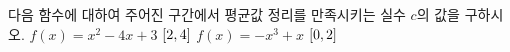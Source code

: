 다음 함수에 대하여 주어진 구간에서 평균값 정리를 만족시키는 실수 $c$의 값을 구하시오.
 $f(x)=x^2-4x+3$ \quad $[2{,}\mkern3mu\mathopen{}4]$
 $f(x)=-x^3+x$ \quad $[0{,}\mkern3mu\mathopen{}2]$
